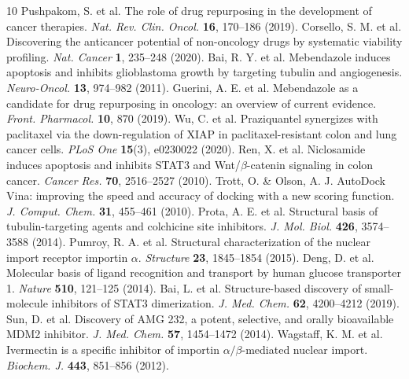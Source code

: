 \documentclass[10pt,a4paper,twocolumn]{article}
\begin{document}
\begin{thebibliography}{10}
 Pushpakom, S. et al. The role of drug repurposing in the development of cancer therapies. \textit{Nat. Rev. Clin. Oncol.} \textbf{16}, 170--186 (2019).
 Corsello, S. M. et al. Discovering the anticancer potential of non-oncology drugs by systematic viability profiling. \textit{Nat. Cancer} \textbf{1}, 235--248 (2020).
 Bai, R. Y. et al. Mebendazole induces apoptosis and inhibits glioblastoma growth by targeting tubulin and angiogenesis. \textit{Neuro-Oncol.} \textbf{13}, 974--982 (2011).
 Guerini, A. E. et al. Mebendazole as a candidate for drug repurposing in oncology: an overview of current evidence. \textit{Front. Pharmacol.} \textbf{10}, 870 (2019).
 Wu, C. et al. Praziquantel synergizes with paclitaxel via the down-regulation of XIAP in paclitaxel-resistant colon and lung cancer cells. \textit{PLoS One} \textbf{15}(3), e0230022 (2020).
 Ren, X. et al. Niclosamide induces apoptosis and inhibits STAT3 and Wnt/$\beta$-catenin signaling in colon cancer. \textit{Cancer Res.} \textbf{70}, 2516--2527 (2010).
 Trott, O. \& Olson, A. J. AutoDock Vina: improving the speed and accuracy of docking with a new scoring function. \textit{J. Comput. Chem.} \textbf{31}, 455--461 (2010).
 Prota, A. E. et al. Structural basis of tubulin-targeting agents and colchicine site inhibitors. \textit{J. Mol. Biol.} \textbf{426}, 3574--3588 (2014).
 Pumroy, R. A. et al. Structural characterization of the nuclear import receptor importin $\alpha$. \textit{Structure} \textbf{23}, 1845--1854 (2015).
 Deng, D. et al. Molecular basis of ligand recognition and transport by human glucose transporter 1. \textit{Nature} \textbf{510}, 121--125 (2014).
 Bai, L. et al. Structure-based discovery of small-molecule inhibitors of STAT3 dimerization. \textit{J. Med. Chem.} \textbf{62}, 4200--4212 (2019).
 Sun, D. et al. Discovery of AMG 232, a potent, selective, and orally bioavailable MDM2 inhibitor. \textit{J. Med. Chem.} \textbf{57}, 1454--1472 (2014).
 Wagstaff, K. M. et al. Ivermectin is a specific inhibitor of importin $\alpha/\beta$-mediated nuclear import. \textit{Biochem. J.} \textbf{443}, 851--856 (2012).
\end{thebibliography}
\end{document}
